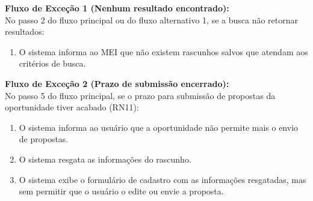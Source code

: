 \noindent\textbf{Fluxo de Exceção 1 (Nenhum resultado encontrado):}\\
No passo 2 do fluxo principal ou do fluxo alternativo 1, se a busca não retornar resultados:
\begin{enumerate}[noitemsep, topsep=-5pt, parsep=0pt]
    \item O sistema informa ao MEI que não existem rascunhos salvos que atendam aos critérios de busca.
\end{enumerate}

\noindent\textbf{Fluxo de Exceção 2 (Prazo de submissão encerrado):}\\
No passo 5 do fluxo principal, se o prazo para submissão de propostas da oportunidade tiver acabado (RN11):
\begin{enumerate}[noitemsep, topsep=-5pt, parsep=0pt]
    \item O sistema informa ao usuário que a oportunidade não permite mais o envio de propostas.
    \item O sistema resgata as informações do rascunho.
    \item O sistema exibe o formulário de cadastro com as informações resgatadas, mas sem permitir que o usuário o edite ou envie a proposta.
\end{enumerate}


